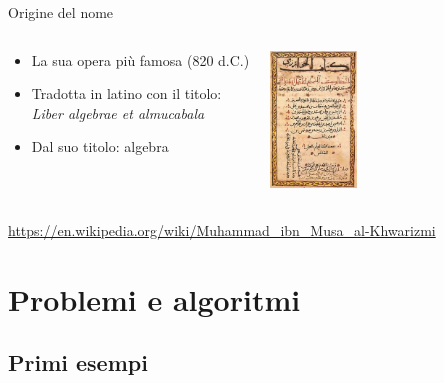 \begin{frame}[shrink=5]{Origine del nome}
\begin{overprint}
\begin{columns}[T]
\begin{myboxtitle}
\begin{itemize}
\item La sua opera più famosa (820 d.C.)
\item Tradotta in latino con il titolo:\\ \emph{Liber algebrae et almucabala}
\item Dal suo titolo: \alert{algebra}
\end{itemize}
\end{myboxtitle}
\begin{center}
\includegraphics[width=2.3cm]{algebra.jpg}
\end{center}
\end{columns}
\end{overprint}

\tiny
\vspace{-6pt}
\url{https://en.wikipedia.org/wiki/Muhammad_ibn_Musa_al-Khwarizmi}

\end{frame}

\section{Problemi e algoritmi}

\subsection{Primi esempi}

